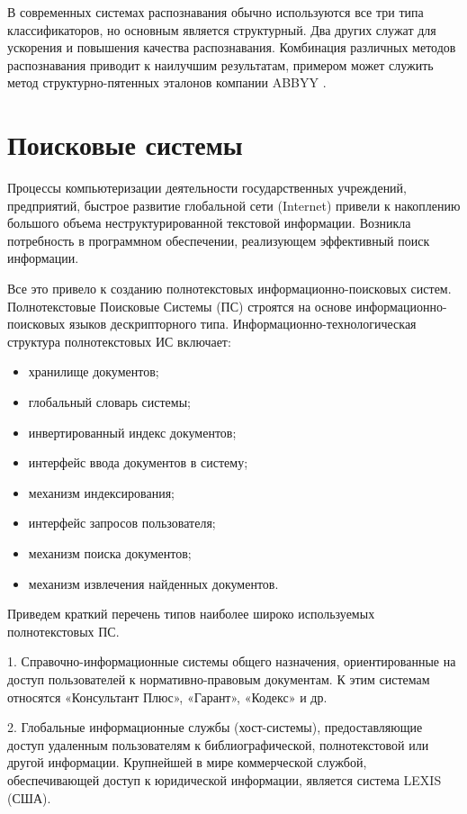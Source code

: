 \begin{table}[]
\end{table}

В современных системах распознавания обычно используются все три типа
классификаторов, но основным является структурный. Два других служат для
ускорения и повышения качества распознавания. Комбинация различных методов
распознавания приводит к наилучшим результатам, примером может служить метод
структурно-пятенных эталонов компании ABBYY \cite{telkov}.


\section{Поисковые системы}
Процессы компьютеризации деятельности государственных учреждений, предприятий, быстрое развитие глобальной сети (Internet) привели к накоплению большого объема неструктурированной текстовой информации. Возникла потребность в программном обеспечении, реализующем эффективный поиск информации.

Все это привело к созданию полнотекстовых информационно-поисковых систем. Полнотекстовые Поисковые Системы (ПС)  строятся на основе информационно-поисковых языков дескрипторного типа. Информационно-технологическая структура полнотекстовых ИС включает:
\begin{itemize}
	\item хранилище документов; 
	\item глобальный словарь системы; 
	\item инвертированный индекс документов; 
	\item интерфейс ввода документов в систему; 
	\item механизм индексирования; 
	\item интерфейс запросов пользователя; 
	\item механизм поиска документов; 
	\item механизм извлечения найденных документов.
\end{itemize} 

Приведем краткий перечень типов наиболее широко используемых полнотекстовых ПС.

1. Справочно-информационные системы общего назначения, ориентированные на доступ пользователей к нормативно-правовым документам. К этим системам относятся «Консультант Плюс», «Гарант», «Кодекс» и др. 

2. Глобальные информационные службы (хост-системы), предоставляющие доступ удаленным пользователям к библиографической, полнотекстовой или другой информации. Крупнейшей в мире коммерческой службой, обеспечивающей доступ к юридической информации, является система LEXIS (США). 

